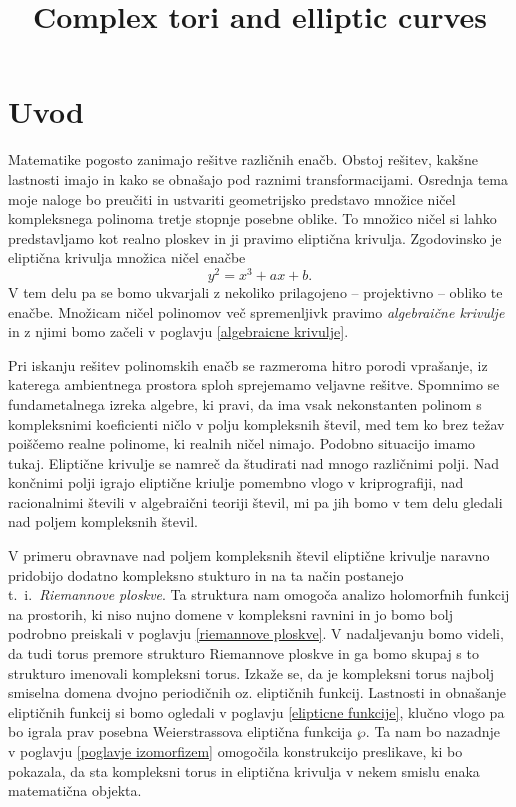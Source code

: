 \documentclass[mat1]{fmfdelo}
\title{Complex tori and elliptic curves}
\theoremstyle{definition}
\begin{document}

\section{Uvod}

Matematike pogosto zanimajo rešitve različnih enačb. Obstoj rešitev, kakšne lastnosti imajo in
kako se obnašajo pod raznimi transformacijami. Osrednja tema moje naloge bo preučiti in ustvariti
geometrijsko predstavo množice ničel kompleksnega polinoma tretje stopnje posebne oblike. 
To množico ničel si lahko predstavljamo kot realno ploskev in ji pravimo eliptična krivulja.   
Zgodovinsko je eliptična krivulja množica ničel enačbe
\[
    y^2 = x^3 + ax + b. 
\]
V tem delu pa se bomo ukvarjali z nekoliko prilagojeno -- projektivno -- obliko te enačbe. Množicam ničel
polinomov več spremenljivk pravimo \emph{algebraične krivulje} in z njimi bomo začeli v poglavju \ref{algebraicne krivulje}. 
\par 
Pri iskanju rešitev
polinomskih enačb se razmeroma hitro porodi vprašanje, iz katerega ambientnega prostora 
sploh sprejemamo veljavne rešitve. Spomnimo se fundametalnega izreka algebre, ki pravi, da ima
vsak nekonstanten polinom s kompleksnimi koeficienti ničlo v polju kompleksnih števil, med tem
ko brez težav poiščemo realne polinome, ki realnih ničel nimajo. Podobno situacijo imamo tukaj. 
Eliptične krivulje se namreč da študirati nad mnogo različnimi polji. Nad končnimi polji igrajo
eliptične kriulje pomembno vlogo v kriprografiji, nad racionalnimi števili v algebraični teoriji
števil, mi pa jih bomo v tem delu gledali nad poljem kompleksnih števil. 
\par
V primeru obravnave nad poljem kompleksnih števil eliptične
krivulje naravno pridobijo dodatno kompleksno stukturo in na ta način postanejo t.~i.\ \emph{Riemannove ploskve}. Ta struktura nam omogoča analizo holomorfnih funkcij na prostorih, ki niso nujno domene v kompleksni ravnini in jo
bomo bolj podrobno preiskali v poglavju \ref{riemannove ploskve}. V nadaljevanju bomo videli, da tudi torus premore strukturo Riemannove ploskve in ga bomo skupaj s to strukturo imenovali kompleksni torus. Izkaže se, da je kompleksni
torus najbolj smiselna domena dvojno periodičnih oz. eliptičnih funkcij. Lastnosti in obnašanje eliptičnih funkcij si bomo ogledali v poglavju \ref{elipticne funkcije}, klučno vlogo pa bo igrala prav posebna Weierstrassova eliptična funkcija $\wp$. Ta nam bo nazadnje v poglavju \ref{poglavje izomorfizem} omogočila konstrukcijo preslikave, ki bo pokazala, da sta kompleksni torus in eliptična krivulja v nekem smislu enaka matematična objekta.
\end{document}
